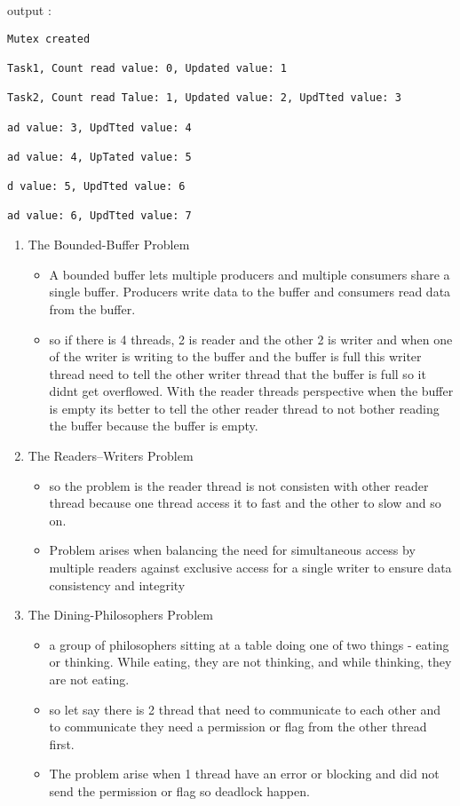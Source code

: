 \documentclass{article}
\begin{document}
output :

\begin{lstlisting}[style=txt]
Mutex created

Task1, Count read value: 0, Updated value: 1

Task2, Count read Talue: 1, Updated value: 2, UpdTted value: 3

ad value: 3, UpdTted value: 4

ad value: 4, UpTated value: 5

d value: 5, UpdTted value: 6

ad value: 6, UpdTted value: 7
\end{lstlisting}

\begin{enumerate}
    \item The Bounded-Buffer Problem
        \begin{itemize}
            \item A bounded buffer lets multiple producers and multiple consumers share a single buffer. Producers write data to the buffer and consumers read data from the buffer.
            \item so if there is 4 threads, 2 is reader and the other 2 is writer and when one of the writer is writing to the buffer and the buffer is full this writer thread need to tell the other writer thread that the buffer is full so it didnt get overflowed. With the reader threads perspective when the buffer is empty its better to tell the other reader thread to not bother reading the buffer because the buffer is empty.
        \end{itemize}
    \item The Readers–Writers Problem
        \begin{itemize}
            \item so the problem is the reader thread is not consisten with other reader thread because one thread access it to fast and the other to slow and so on.
            \item Problem arises when balancing the need for simultaneous access by multiple readers against exclusive access for a single writer to ensure data consistency and integrity \end{itemize}
    \item The Dining-Philosophers Problem
        \begin{itemize}
            \item a group of philosophers sitting at a table doing one of two things - eating or thinking. While eating, they are not thinking, and while thinking, they are not eating.
            \item so let say there is 2 thread that need to communicate to each other and to communicate they need a permission or flag from the other thread first.
            \item The problem arise when 1 thread have an error or blocking and did not send the permission or flag so deadlock happen. 
        \end{itemize}
\end{enumerate}
\end{document}
